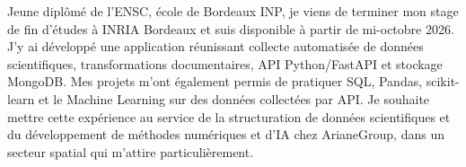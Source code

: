 
\begin{cvparagraph}
Jeune diplômé de l’ENSC, école de Bordeaux INP, je viens de terminer mon stage de fin d’études à INRIA Bordeaux et suis disponible à partir de mi-octobre 2026. J’y ai développé une application réunissant collecte automatisée de données scientifiques, transformations documentaires, API Python/FastAPI et stockage MongoDB. Mes projets m’ont également permis de pratiquer SQL, Pandas, scikit-learn et le Machine Learning sur des données collectées par API. Je souhaite mettre cette expérience au service de la structuration de données scientifiques et du développement de méthodes numériques et d’IA chez ArianeGroup, dans un secteur spatial qui m’attire particulièrement.
\end{cvparagraph}
